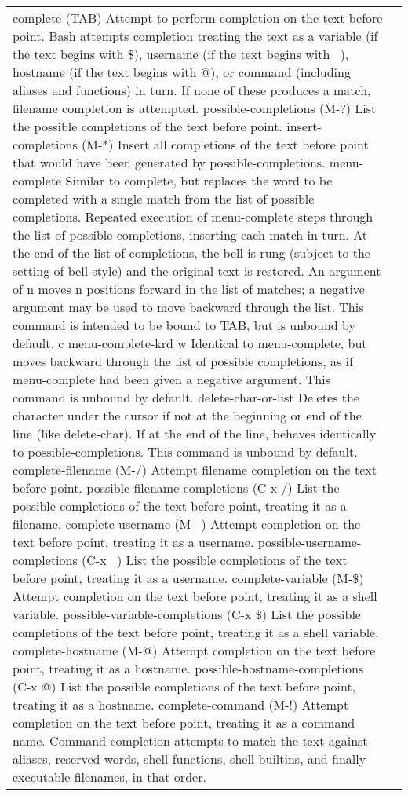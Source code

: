 \documentclass[11pt]{article}
\begin{document}
\begin{longtable}{p{}p{}}
{{{complete (TAB)
Attempt to perform completion on the text before point. Bash attempts completion treating the text as a variable (if the text begins with \$), username (if the text begins with ~), hostname (if the text begins with @), or command (including aliases and functions) in turn. If none of these produces a match, filename completion is attempted.
possible-completions (M-?)
List the possible completions of the text before point.
insert-completions (M-*)
Insert all completions of the text before point that would have been generated by possible-completions.
menu-complete
Similar to complete, but replaces the word to be completed with a single match from the list of possible completions. Repeated execution of menu-complete steps through the list of possible completions, inserting each match in turn. At the end of the list of completions, the bell is rung (subject to the setting of bell-style) and the original text is restored. An argument of n moves n positions forward in the list of matches; a negative argument may be used to move backward through the list. This command is intended to be bound to TAB, but is unbound by default.
c menu-complete-krd w
Identical to menu-complete, but moves backward through the list of possible completions, as if menu-complete had been given a negative argument. This command is unbound by default.
delete-char-or-list
Deletes the character under the cursor if not at the beginning or end of the line (like delete-char). If at the end of the line, behaves identically to possible-completions. This command is unbound by default.
complete-filename (M-/)
Attempt filename completion on the text before point.
possible-filename-completions (C-x /)
List the possible completions of the text before point, treating it as a filename.
complete-username (M-~)
Attempt completion on the text before point, treating it as a username.
possible-username-completions (C-x ~)
List the possible completions of the text before point, treating it as a username.
complete-variable (M-\$)
Attempt completion on the text before point, treating it as a shell variable.
possible-variable-completions (C-x \$)
List the possible completions of the text before point, treating it as a shell variable.
complete-hostname (M-@)
Attempt completion on the text before point, treating it as a hostname.
possible-hostname-completions (C-x @)
List the possible completions of the text before point, treating it as a hostname.
complete-command (M-!)
Attempt completion on the text before point, treating it as a command name. Command completion attempts to match the text against aliases, reserved words, shell functions, shell builtins, and finally executable filenames, in that order.
}}}
\end{longtable}
\end{document}
